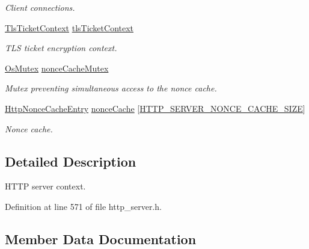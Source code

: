 \begin{DoxyCompactItemize}
\begin{DoxyCompactList}\small\item\em Client connections. \end{DoxyCompactList}\item 
\hyperlink{structTlsTicketContext}{Tls\+Ticket\+Context} \hyperlink{struct__HttpServerContext_a13867077389bceb7d4b18d0fa6a20a3f}{tls\+Ticket\+Context}
\begin{DoxyCompactList}\small\item\em T\+LS ticket encryption context. \end{DoxyCompactList}\item 
\hyperlink{structOsMutex}{Os\+Mutex} \hyperlink{struct__HttpServerContext_a7de91a857fc86e020d261d136e0db85d}{nonce\+Cache\+Mutex}
\begin{DoxyCompactList}\small\item\em Mutex preventing simultaneous access to the nonce cache. \end{DoxyCompactList}\item 
\hyperlink{structHttpNonceCacheEntry}{Http\+Nonce\+Cache\+Entry} \hyperlink{struct__HttpServerContext_ab32838f640fd623c445ee692a5819b60}{nonce\+Cache} \mbox{[}\hyperlink{http__server_8h_ad440bedce9872300d063b72fa5e2cd7a}{H\+T\+T\+P\+\_\+\+S\+E\+R\+V\+E\+R\+\_\+\+N\+O\+N\+C\+E\+\_\+\+C\+A\+C\+H\+E\+\_\+\+S\+I\+ZE}\mbox{]}
\begin{DoxyCompactList}\small\item\em Nonce cache. \end{DoxyCompactList}\end{DoxyCompactItemize}


\subsection{Detailed Description}
H\+T\+TP server context. 

Definition at line 571 of file http\+\_\+server.\+h.



\subsection{Member Data Documentation}
\mbox{\label{struct__HttpServerContext_a2ca632a8ca3ae40bd4c5c4470a178c07}} 
